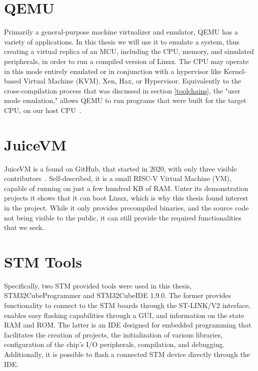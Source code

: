 \section{QEMU}\label{qemu.ch}
Primarily a general-purpose machine virtualizer and emulator, QEMU has a variety of applications. In this thesis we will use it to emulate a system, thus creating a virtual replica of an MCU, including the CPU, memory, and simulated peripherals, in order to run a compiled version of Linux. The CPU may operate in this mode entirely emulated or in conjunction with a hypervisor like Kernel-based Virtual Machine (KVM), Xen, Hax, or Hypervisor. Equivalently to the cross-compilation process that was discussed in section \ref{toolchains}, the "user mode emulation," allows QEMU to run programs that were built for the target CPU, on our host CPU~\cite{qemu}.

\section{JuiceVM}
JuiceVM is a found on GitHub, that started in 2020, with only three visible contributors~\cite{juicevm}. Self-described, it is a small RISC-V Virtual Machine (VM), capable of running on just a few hundred KB of RAM. Unter its demonstration projects it shows that it can boot Linux, which is why this thesis found interest in the project. While it only provides precompiled binaries, and the source code not being visible to the public, it can still provide the required functionalities that we seek.

\section {STM Tools}\label{stm.ch}
Specifically, two STM provided tools were used in this thesis, STM32CubeProgrammer and STM32CubeIDE 1.9.0. The former provides functionality to connect to the STM boards through the ST-LINK/V2 interface, enables easy flashing capabilities through a GUI, and information on the state RAM and ROM. The latter is an IDE designed for embedded programming that facilitates the creation of projects, the initialization of various libraries, configuration of the chip's I/O peripherals, compilation, and debugging. Additionally, it is possible to flash a connected STM device directly through the IDE.

